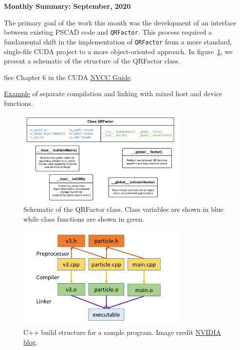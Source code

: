 \documentclass[11pt,letterpaper]{article}
\begin{document}
\begin{center}
    {\Large \bf Monthly Summary: September, 2020}
\end{center}

The primary goal of the work this month was the development of an interface between existing PSCAD code and \verb+QRFactor+. This process required a fundamental shift in the implementation of \verb+QRFactor+ from a more standard, single-file CUDA project to a more object-oriented approach. In figure~\ref{f:OO}, we present a schematic of the structure of the QRFactor class.

See Chapter 6 in the CUDA \href{https://docs.nvidia.com/cuda/pdf/CUDA_Compiler_Driver_NVCC.pdf}{NVCC Guide}. 

\href{https://developer.nvidia.com/blog/separate-compilation-linking-cuda-device-code/}{Example} of separate compilation and linking with mixed host and device functions.

\begin{figure}[ht]
    \centering
    \includegraphics[width=0.75\textwidth]{MHI QRFactor.pdf}
    \caption{Schematic of the QRFactor class. Class variables are shown in blue while class functions are shown in green.}
    \label{f:OO}
\end{figure}

\begin{figure}
    \centering
    \includegraphics[width=0.75\textwidth]{C++BuildStructure.png}
    \caption[]{C++ build structure for a sample program. Image credit \href{https://developer.nvidia.com/blog/separate-compilation-linking-cuda-device-code/}{NVIDIA blog}.}
    \label{f:example}
\end{figure}
\end{document}
